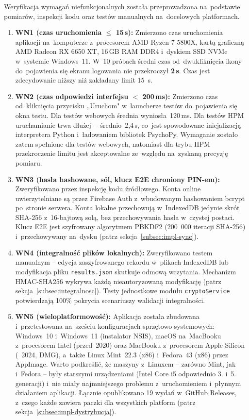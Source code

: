 \documentclass[12pt, a4paper, oneside]{report}
\begin{document}
Weryfikacja wymagań niefunkcjonalnych została przeprowadzona na~podstawie pomiarów, inspekcji kodu oraz testów manualnych na~docelowych platformach.

\begin{enumerate}
	\item \textbf{WN1 (czas uruchomienia $\le$ 15\,s):}
	      Zmierzono czas uruchomienia aplikacji na~komputerze z~procesorem AMD Ryzen 7 5800X, kartą graficzną AMD Radeon RX 6650 XT, 16\,GB RAM DDR4 i~dyskiem SSD NVMe w~systemie Windows~11. W~10 próbach średni czas od~dwukliknięcia ikony do~pojawienia się ekranu logowania nie przekroczył \textbf{2\,s}. Czas jest zdecydowanie niższy niż zakładany limit 15~s.

	\item \textbf{WN2 (czas odpowiedzi interfejsu $<$ 200\,ms):}
	      Zmierzono czas od~kliknięcia przycisku „Uruchom" w~launcherze testów do~pojawienia się okna testu. Dla testów webowych średnia wyniosła~120\,ms. Dla testów HPM uruchamianie trwa dłużej~-- średnio~2,4\,s, co~jest spowodowane inicjalizacją interpretera Python i~ładowaniem bibliotek PsychoPy. Wymaganie zostało zatem spełnione dla testów webowych, natomiast dla trybu HPM przekroczenie limitu jest akceptowalne ze~względu na~zyskaną precyzję pomiaru.

	\item \textbf{WN3 (hasła hashowane, sól, klucz E2E chroniony PIN-em):}
	      Zweryfikowano przez inspekcję kodu źródłowego. Konta online uwierzytelniane są przez Firebase Auth z~wbudowanym hashowaniem bcrypt po~stronie serwera. Konta lokalne przechowują w~IndexedDB jedynie skrót SHA-256 z~16-bajtową solą, bez przechowywania hasła w~czystej postaci. Klucz E2E jest szyfrowany algorytmem PBKDF2 (200~000 iteracji SHA-256) i~przechowywany na~dysku (patrz sekcja~\ref{subsec:impl-sync}).

	\item \textbf{WN4 (integralność plików lokalnych):}
	      Zweryfikowano testem manualnym -- edycja zaszyfrowanego rekordu w~plikach IndexedDB lub modyfikacja pliku \texttt{results.json} skutkuje odmową wczytania. Mechanizm HMAC-SHA256 wykrywa każdą nieautoryzowaną modyfikację (patrz sekcja~\ref{subsec:integralnosc}). Testy jednostkowe modułu \texttt{cryptoService} potwierdzają 100\% pokrycia scenariuszy walidacji integralności.

	\item \textbf{WN5 (wieloplatformowość):}
	      Aplikacja została zbudowana i~przetestowana na~sześciu konfiguracjach sprzętowo-systemowych: Windows~10 i~Windows~11 (instalator NSIS), macOS na~MacBooku z~procesorem Intel (przed~2020) oraz MacBooku z~procesorem Apple Silicon (~2024, DMG), a~także Linux Mint~22.3 (x86) i~Fedora~43 (x86) przez AppImage. Warto podkreślić, że maszyny z~Linuxem -- zarówno Mint, jak i~Fedora -- były starszymi urządzeniami (Intel Core i5 odpowiednio 3. i~5. generacji) i~nie miały najmniejszego problemu z~uruchomieniem i~płynnym działaniem aplikacji. Łącznie opublikowano 19 wydań w~GitHub Releases, z~czego ka\.{z}de zawiera paczki dla wszystkich platform (patrz sekcja~\ref{subsec:impl-dystrybucja}).


\end{enumerate}
\end{document}
